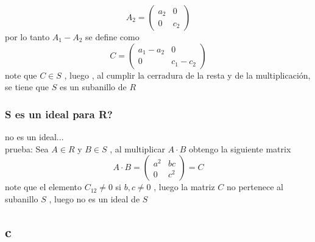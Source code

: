 \documentclass[10pt,a4paper]{article} %
\begin{document}
                \begin{equation}
                    A_2 = \begin{pmatrix}
                        a_2 & 0
                        \\
                        0 & c_2
                    \end{pmatrix}
                \end{equation}
                por lo tanto $ A_1 - A_2  $  se define como
                \begin{equation}
                    C = \begin{pmatrix}
                        a_1 - a_2 & 0
                        \\
                        0 & c_1 - c_2
                    \end{pmatrix}
                \end{equation}
                note que $ C \in S  $ , luego , al cumplir la cerradura de la
                resta y de la multiplicación, se tiene que $ S  $ es un
                subanillo de $ R  $

            \subsubsection{S es un ideal para R?}
                no es un ideal...
                \\
                prueba: Sea $ A \in  R  $  y $ B \in  S  $ , al multiplicar $ A
                \cdot  B  $  obtengo la siguiente matrix
                \begin{equation}
                    A \cdot  B = \begin{pmatrix}
                        a ^{2} & bc
                        \\
                        0 & c ^{2}
                    \end{pmatrix}
                    = C
                \end{equation}
                note que el elemento $ C_{12} \not= 0  $ si $ b , c \not= 0  $
                , luego la matriz $ C  $ no pertenece al subanillo $ S  $ ,
                luego no es un ideal de $ S  $

        \subsection{c}






































    \nocite{*}
    
    
\end{document}
